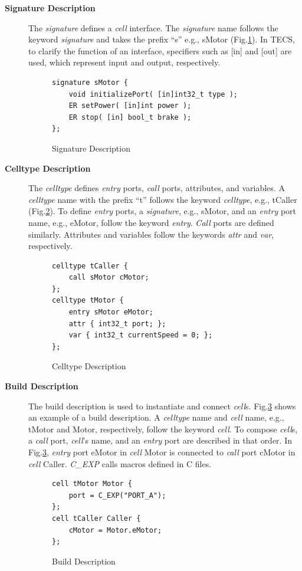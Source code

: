 \documentclass[JIP]{ipsj_v2/UTF8/ipsj}
\begin{document}
\begin{description}
    \item[{\bf Signature Description}]
        The {\it signature} defines a {\it cell} interface.
        The {\it signature} name follows the keyword {\it signature} and takes the prefix ``s'' e.g., sMotor (Fig.\ref{signature}).
        In TECS, to clarify the function of an interface, specifiers such as [in] and [out] are used, which represent input and output, respectively.
\begin{figure}[t]
\centering
\begin{lstlisting}
signature sMotor {
    void initializePort( [in]int32_t type );
    ER setPower( [in]int power );
    ER stop( [in] bool_t brake );
};
\end{lstlisting}
\caption{Signature Description}
\label{signature}
\end{figure}
    \item[{\bf Celltype Description}]
        The {\it celltype} defines {\it entry} ports, {\it call} ports, attributes, and variables.
        A {\it celltype} name with the prefix ``t'' follows the keyword {\it celltype}, e.g., tCaller (Fig.\ref{celltype}).
        To define {\it entry} ports, a {\it signature}, e.g., sMotor, and an {\it entry} port name, e.g., eMotor, follow the keyword {\it entry}.
        {\it Call} ports are defined similarly.
        Attributes and variables follow the keywords {\it attr} and {\it var}, respectively.
\begin{figure}[t]
\centering
\begin{lstlisting}
celltype tCaller {
    call sMotor cMotor;
};
celltype tMotor {
    entry sMotor eMotor;
    attr { int32_t port; };
    var { int32_t currentSpeed = 0; };
};
\end{lstlisting}
\caption{Celltype Description}
\label{celltype}
\end{figure}
    \item[{\bf Build Description}]
        The build description is used to instantiate and connect {\it cell}s.
        Fig.\ref{build} shows an example of a build description.
        A {\it celltype} name and {\it cell} name, e.g., tMotor and Motor, respectively, follow the keyword {\it cell}.
        To compose {\it cell}s, a {\it call} port, {\it cell}'s name, and an {\it entry} port are described in that order.
        In Fig.\ref{build}, {\it entry} port eMotor in {\it cell} Motor is connected to {\it call} port cMotor in {\it cell} Caller.
        {\it C\_EXP} calls macros defined in C files.

\begin{figure}[t]
\centering
\begin{lstlisting}
cell tMotor Motor {
    port = C_EXP("PORT_A");
};
cell tCaller Caller {
    cMotor = Motor.eMotor;
};
\end{lstlisting}
\caption{Build Description}
\label{build}
\end{figure}

\end{description}
\end{document}
